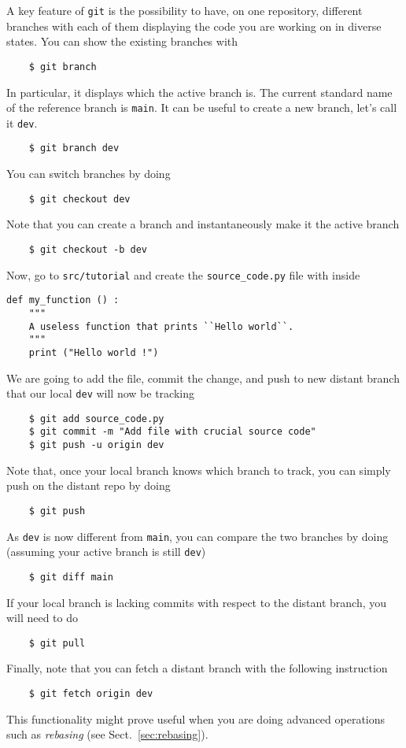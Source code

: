 \documentclass{article}
\begin{document}
A key feature of \texttt{git} is the possibility to have, on one repository, different branches with each of them displaying the code you are working on in diverse states.
You can show the existing branches with 
\begin{lstlisting}
    $ git branch
\end{lstlisting}
In particular, it displays which the active branch is.
The current standard name of the reference branch is \texttt{main}. It can be useful to create a new branch, let's call it \texttt{dev}. 
\begin{lstlisting}
    $ git branch dev
\end{lstlisting}
You can switch branches by doing
\begin{lstlisting}
    $ git checkout dev
\end{lstlisting}
Note that you can create a branch and instantaneously make it the active branch
\begin{lstlisting}
    $ git checkout -b dev
\end{lstlisting}
Now, go to \texttt{src/tutorial} and create the \texttt{source\_code.py} file with inside
\begin{lstlisting}
def my_function () :
    """
    A useless function that prints ``Hello world``.
    """
    print ("Hello world !")
\end{lstlisting}
We are going to add the file, commit the change, and push to new distant branch that our local \texttt{dev} will now be tracking
\begin{lstlisting}
    $ git add source_code.py
    $ git commit -m "Add file with crucial source code"
    $ git push -u origin dev
\end{lstlisting}
Note that, once your local branch knows which branch to track, you can simply push on the distant repo by doing 
\begin{lstlisting}
    $ git push
\end{lstlisting}
As \texttt{dev} is now different from \texttt{main}, you can compare the two branches by doing (assuming your active branch is still \texttt{dev})
\begin{lstlisting}
    $ git diff main
\end{lstlisting}
If your local branch is lacking commits with respect to the distant branch, you will need to do 
\begin{lstlisting}
    $ git pull
\end{lstlisting}
Finally, note that you can fetch a distant branch with the following instruction 
\begin{lstlisting}
    $ git fetch origin dev
\end{lstlisting}
This functionality might prove useful when you are doing advanced operations such as \textit{rebasing} (see Sect.~\ref{sec:rebasing}).
\end{document}
